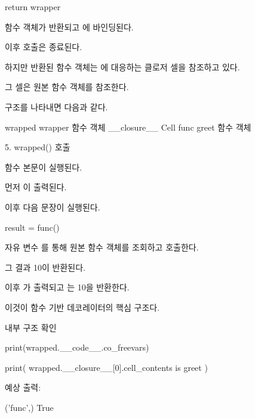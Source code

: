 \begin{dhkcode}
return wrapper
\end{dhkcode}

 함수 객체가 반환되고 에 바인딩된다.

이후  호출은 종료된다.

하지만 반환된  함수 객체는 에 대응하는 클로저 셀을 참조하고 있다.

그 셀은 원본  함수 객체를 참조한다.

구조를 나타내면 다음과 같다.

\begin{dhksmry}[centered]
wrapped
\da
wrapper 함수 객체
\da
__closure__
\da
Cell func
\da
greet 함수 객체
\end{dhksmry}

\begin{dhknote}
\begin{dhksmry}[centered]
5. wrapped() 호출
\end{dhksmry}
\end{dhknote}

 함수 본문이 실행된다.

먼저 이 출력된다.

이후 다음 문장이 실행된다.

\begin{dhkcode}
result = func()
\end{dhkcode}

자유 변수 를 통해 원본  함수 객체를 조회하고 호출한다.

그 결과 10이 반환된다.

이후 가 출력되고 는 10을 반환한다.

이것이 함수 기반 데코레이터의 핵심 구조다.

\begin{dhknote}
\begin{dhksmry}[centered]
내부 구조 확인
\end{dhksmry}
\end{dhknote}

\begin{dhkcode}
print(wrapped.__code__.co_freevars)

print(
    wrapped.__closure__[0].cell_contents
    is greet
)
\end{dhkcode}

예상 출력:

\begin{dhkzsh}
('func',)
True
\end{dhkzsh}

